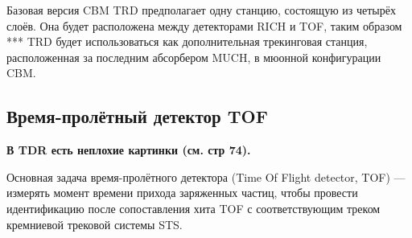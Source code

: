 
Базовая версия CBM TRD предполагает одну станцию, состоящую из четырёх слоёв.
Она будет расположена между детекторами RICH и TOF, таким образом ***
TRD будет использоваться как дополнительная трекинговая станция, расположенная за последним абсорбером MUCH, в мюонной конфигурации CBM.



\subsection{Время-пролётный детектор TOF}\label{sec:secTOF}

\textbf{В TDR есть неплохие картинки (см. стр 74).}


Основная задача время-пролётного детектора (Time Of Flight detector, TOF) --- измерять момент времени прихода заряженных частиц, чтобы провести идентификацию после сопоставления хита TOF с соответствующим треком кремниевой трековой системы STS.


